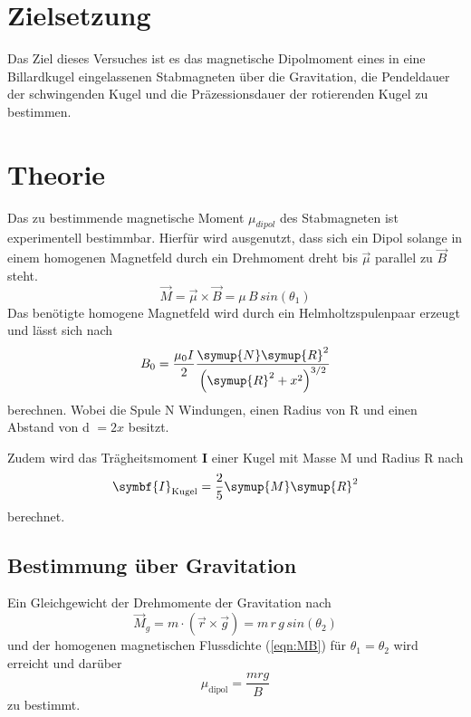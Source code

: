 \section{Zielsetzung}
\label{sec:Zielsetzung}

Das Ziel dieses Versuches ist es das magnetische Dipolmoment eines in eine
Billardkugel eingelassenen Stabmagneten über die Gravitation, die Pendeldauer
der schwingenden Kugel und die Präzessionsdauer der rotierenden Kugel zu bestimmen.


\section{Theorie}
\label{sec:Theorie}

Das zu bestimmende magnetische Moment $\mu_{dipol}$ des Stabmagneten
ist experimentell bestimmbar. Hierfür wird ausgenutzt, dass
sich ein Dipol solange in einem homogenen Magnetfeld durch ein
Drehmoment dreht bis $\vec{\mu}$ parallel zu $\vec{B}$ steht.
\begin{equation}
  \vec{M} = \vec{\mu} \times \vec{B} = \mu \, B \, sin(\theta_{1})
  \label{eqn:MB}
\end{equation}
Das benötigte homogene Magnetfeld wird durch ein Helmholtzspulenpaar erzeugt
und lässt sich nach
\begin{equation}
  B_0 = \frac{\mu_0I}{2}\frac{\symup{N}\symup{R}^2}{\left(\symup{R}^2+x^2\right)^{3/2}}
  \label{eqn:b0}
\end{equation}
berechnen. Wobei die Spule N Windungen, einen Radius von R und einen Abstand von d $=2x$
besitzt.

Zudem wird das Trägheitsmoment $\symbf{I}$ einer Kugel mit Masse M und Radius R nach
\begin{equation}
  \symbf{I}_\text{Kugel}=\frac{2}{5}\symup{M}\symup{R}^2
  \label{eqn:Ik}
\end{equation}
berechnet.

\subsection{Bestimmung über Gravitation}
Ein Gleichgewicht der Drehmomente der Gravitation nach
\begin{equation}
  {\vec{M}}_{g}= m \cdot \left(\vec{r}\times\vec{g}\right) = m\, r \, g\, sin(\theta_{2})
\end{equation}
und der homogenen magnetischen Flussdichte (\ref{eqn:MB})
für $\theta_1 =\theta_2$ wird erreicht und darüber
\begin{equation}
  \mu_\text{dipol}=\frac{mrg}{B}
  \label{eqn:grav}
\end{equation}
zu bestimmt.
